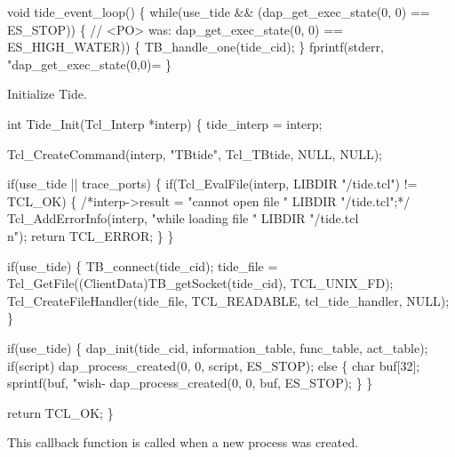
\nwenddocs{}\endmoddef\let\nwnotused=\nwoutput{}
void tide_event_loop()
\{
  while(use_tide && (dap_get_exec_state(0, 0) == ES_STOP)) \{
 // <PO> was:       dap_get_exec_state(0, 0) == ES_HIGH_WATER)) \{
    TB_handle_one(tide_cid);
  \}
  fprintf(stderr, "dap_get_exec_state(0,0)=%
\}
\nwendcode{}\nwdocspar


Initialize Tide.

\nwenddocs{}\endmoddef\let\nwnotused=\nwoutput{}
int Tide_Init(Tcl_Interp *interp)
\{
  tide_interp = interp;

  Tcl_CreateCommand(interp, "TBtide", Tcl_TBtide, NULL, NULL);

  if(use_tide || trace_ports) \{
    if(Tcl_EvalFile(interp, LIBDIR "/tide.tcl") != TCL_OK) \{
      /*interp->result = "cannot open file " LIBDIR "/tide.tcl";*/
      Tcl_AddErrorInfo(interp, "while loading file " LIBDIR "/tide.tcl\\n");
      return TCL_ERROR;
    \}
  \}

  if(use_tide) \{
    TB_connect(tide_cid);
    tide_file = Tcl_GetFile((ClientData)TB_getSocket(tide_cid), TCL_UNIX_FD);
    Tcl_CreateFileHandler(tide_file, TCL_READABLE, tcl_tide_handler, NULL);
  \}

  if(use_tide) \{
    dap_init(tide_cid, information_table, func_table, act_table);
    if(script)
      dap_process_created(0, 0, script, ES_STOP);
    else \{
      char buf[32];
      sprintf(buf, "wish-%
      dap_process_created(0, 0, buf, ES_STOP);
    \}
  \}

  return TCL_OK;
\}
\nwendcode{}\nwdocspar



This callback function is called when a new process was created.

